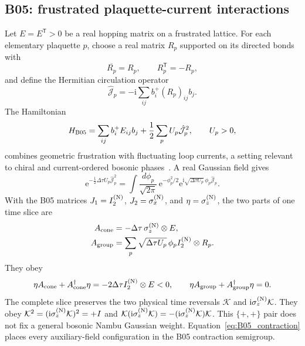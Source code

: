 \documentclass[onecolumn,aps,prb,amsmath,amssymb,superscriptaddress,longbibliography,floatfix]{revtex4-2}
\newcommand{\ee}{\mathrm{e}}
\newcommand{\ii}{\mathrm{i}}
\newcommand{\trans}{\mathsf{T}}
\newcommand{\mc}[1]{\mathcal{#1}}
\begin{document}
\subsection*{B05: frustrated plaquette-current interactions}

Let \(E=E^\trans>0\) be a real hopping matrix on a frustrated lattice.  For each elementary plaquette \(p\), choose a real matrix \(R_p\) supported on its directed bonds with
\begin{equation}
\overline{R_p}=R_p,\qquad R_p^\trans=-R_p,
\end{equation}
and define the Hermitian circulation operator
\begin{equation}
\hat{\mathcal J}_p=-\ii\sum_{ij}b_i^+(R_p)_{ij}b_j.
\end{equation}
The Hamiltonian
\begin{equation}
H_{\rm B05}=\sum_{ij}b_i^+E_{ij}b_j
+\frac12\sum_p U_p\hat{\mathcal J}_p^2,
\qquad U_p>0,
\label{eq:B05_model}
\end{equation}
combines geometric frustration with fluctuating loop currents, a setting relevant to chiral and current-ordered bosonic phases~\cite{you2012prl,zaletel2014prb,dhar2013}.  A real Gaussian field gives
\begin{equation}
\ee^{-\frac12\Delta\tau U_p\hat{\mathcal J}_p^2}
=\int\frac{d\phi_p}{\sqrt{2\pi}}\,
\ee^{-\phi_p^2/2}
\ee^{\ii\sqrt{\Delta\tau U_p}\,\phi_p\hat{\mathcal J}_p}.
\label{eq:B05_HS}
\end{equation}
With the B05 matrices \(J_1=I_2^{({\rm N})}\), \(J_2=\sigma_x^{({\rm N})}\), and \(\eta=\sigma_z^{({\rm N})}\), the two parts of one time slice are
\begin{align}
A_{\rm cone}&=-\Delta\tau\,\sigma_z^{({\rm N})}\otimes E,\notag\\
A_{\rm group}&=\sum_p\sqrt{\Delta\tau U_p}\,\phi_p
 I_2^{({\rm N})}\otimes R_p.
\label{eq:B05_slices}
\end{align}
They obey
\begin{equation}
\eta A_{\rm cone}+A_{\rm cone}^\dagger\eta
=-2\Delta\tau I_2^{({\rm N})}\otimes E<0,
\qquad
\eta A_{\rm group}+A_{\rm group}^\dagger\eta=0.
\label{eq:B05_contraction}
\end{equation}
The complete slice preserves the two physical time reversals \(\mc K\) and \(\ii\sigma_z^{({\rm N})}\mc K\).  They obey \(\mc K^2=(\ii\sigma_z^{({\rm N})}\mc K)^2=+I\) and \(\mc K(\ii\sigma_z^{({\rm N})}\mc K)=-(\ii\sigma_z^{({\rm N})}\mc K)\mc K\).  This \(\{+,+\}\) pair does not fix a general bosonic Nambu Gaussian weight.  Equation~\eqref{eq:B05_contraction} places every auxiliary-field configuration in the B05 contraction semigroup.
\end{document}
